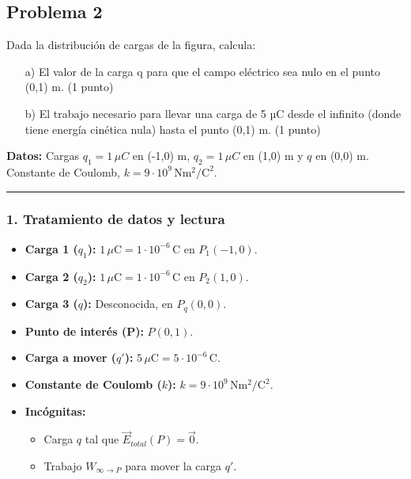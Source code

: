 \newpage
\subsection{Problema 2}
\label{subsec:P2_2024_jul_ext}

\begin{cajaenunciado}
Dada la distribución de cargas de la figura, calcula:
\begin{enumerate}
    \item[a)] El valor de la carga q para que el campo eléctrico sea nulo en el punto (0,1) m. (1 punto)
    \item[b)] El trabajo necesario para llevar una carga de 5 µC desde el infinito (donde tiene energía cinética nula) hasta el punto (0,1) m. (1 punto)
\end{enumerate}
\textbf{Datos:} Cargas $q_1=1\,\mu C$ en (-1,0) m, $q_2=1\,\mu C$ en (1,0) m y $q$ en (0,0) m. Constante de Coulomb, $k=9 \cdot 10^{9} \, \text{N}\text{m}^2/\text{C}^2$.
\end{cajaenunciado}
\hrule

\subsubsection*{1. Tratamiento de datos y lectura}
\begin{itemize}
    \item \textbf{Carga 1 ($q_1$):} $1 \, \mu\text{C} = 1 \cdot 10^{-6} \, \text{C}$ en $P_1(-1, 0)$.
    \item \textbf{Carga 2 ($q_2$):} $1 \, \mu\text{C} = 1 \cdot 10^{-6} \, \text{C}$ en $P_2(1, 0)$.
    \item \textbf{Carga 3 ($q$):} Desconocida, en $P_q(0, 0)$.
    \item \textbf{Punto de interés (P):} $P(0, 1)$.
    \item \textbf{Carga a mover ($q'$):} $5 \, \mu\text{C} = 5 \cdot 10^{-6} \, \text{C}$.
    \item \textbf{Constante de Coulomb ($k$):} $k=9 \cdot 10^{9} \, \text{N}\text{m}^2/\text{C}^2$.
    \item \textbf{Incógnitas:}
    \begin{itemize}
        \item Carga $q$ tal que $\vec{E}_{total}(P) = \vec{0}$.
        \item Trabajo $W_{\infty \to P}$ para mover la carga $q'$.
    \end{itemize}
\end{itemize}

